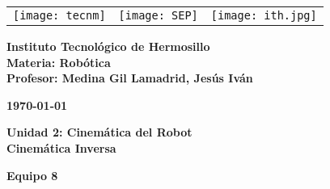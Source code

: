 \begin{titlepage}
	\centering
	\begin{tabular}{@{}p{} p{} p{}@{}}
		\texttt{[image: tecnm]} & 
		\centering \texttt{[image: SEP]} & 
		\raggedleft \texttt{[image: ith.jpg]} \\
	\end{tabular}
	
	\vspace{2em}
	
	\noindent
	\begin{minipage}[t]{0.48\textwidth}
		\raggedright
		\small \textbf{%
			Instituto Tecnológico de Hermosillo\\
			Materia: Robótica\\
			Profesor: Medina Gil Lamadrid, Jesús Iván%
		}
	\end{minipage}%
	\hfill
	\begin{minipage}[t]{0.48\textwidth}
		\raggedleft
		\small \textbf{\today}
	\end{minipage}
	
	\vspace{2em}
	
	{\large \textbf{Unidad 2: Cinemática del Robot}}\\
	
	\vspace{1em}
	{\Huge \textbf{Cinemática Inversa}}
		
	\vspace{1em}
	
	\begin{center}
		{\Large \textbf{Equipo 8}}
	\end{center}
	
	\vspace{1em}
	

\end{titlepage}
